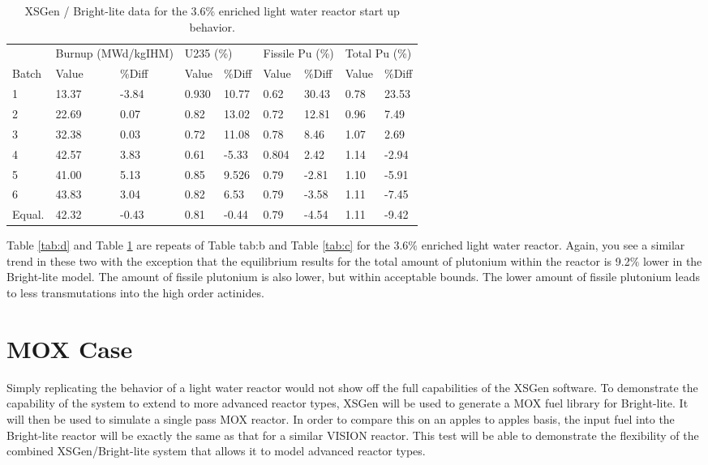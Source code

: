 \documentclass{article}
\begin{document}
\begin{table}[!htb]
\centering
\caption{XSGen / Bright-lite data for the 3.6\% enriched light water reactor start up behavior.}
\label{tab:e}
\begin{tabular}{lllllllll}
 & \multicolumn{2}{l}{Burnup (MWd/kgIHM)} & \multicolumn{2}{l}{U235 (\%)} & \multicolumn{2}{l}{Fissile Pu (\%)} & \multicolumn{2}{l}{Total Pu (\%)} \\
Batch & Value & \%Diff & Value & \%Diff & Value & \%Diff & Value & \%Diff \\
1 & 13.37 & -3.84 & 0.930 & 10.77 & 0.62 & 30.43 & 0.78 & 23.53 \\
2 & 22.69 & 0.07 & 0.82 & 13.02 & 0.72 & 12.81 & 0.96 & 7.49 \\
3 & 32.38 & 0.03 & 0.72 & 11.08 & 0.78 & 8.46 & 1.07 & 2.69 \\
4 & 42.57 & 3.83 & 0.61 & -5.33 & 0.804 & 2.42 & 1.14 & -2.94 \\
5 & 41.00 & 5.13 & 0.85 & 9.526 & 0.79 & -2.81 & 1.10 & -5.91 \\
6 & 43.83 & 3.04 & 0.82 & 6.53 & 0.79 & -3.58 & 1.11 & -7.45 \\
Equal. & 42.32 & -0.43 & 0.81 & -0.44 & 0.79 & -4.54 & 1.11 & -9.42
\end{tabular}
\end{table}

Table \ref{tab:d} and Table \ref{tab:e} are repeats of Table {tab:b} and Table \ref{tab:c} for the 3.6$\%$ enriched light water reactor. Again, you see a similar trend in these two with the exception that the equilibrium results for the total amount of plutonium within the reactor is 9.2$\%$ lower in the Bright-lite model. The amount of fissile plutonium is also lower, but within acceptable bounds. The lower amount of fissile plutonium leads to less transmutations into the high order actinides. 

\section{MOX Case}
Simply replicating the behavior of a light water reactor would not show off the full capabilities of the XSGen software. To demonstrate the capability of the system to extend to more advanced reactor types, XSGen will be used to generate a MOX fuel library for Bright-lite. It will then be used to simulate a single pass MOX reactor. In order to compare this on an apples to apples basis, the input fuel into the Bright-lite reactor will be exactly the same as that for a similar VISION reactor. This test will be able to demonstrate the flexibility of the combined XSGen/Bright-lite system that allows it to model advanced reactor types. 
\end{document}
